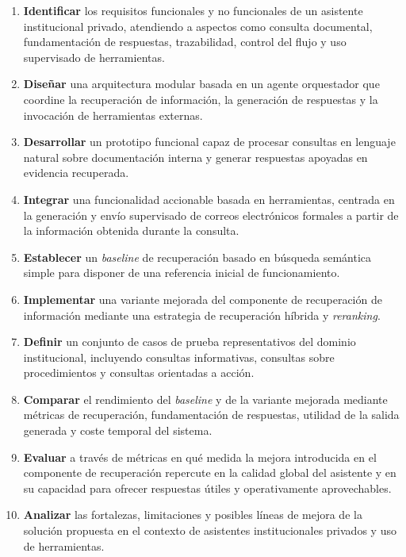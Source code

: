 \begin{enumerate}
    \item \textbf{Identificar} los requisitos funcionales y no funcionales de un asistente institucional privado, atendiendo a aspectos como consulta documental, fundamentación de respuestas, trazabilidad, control del flujo y uso supervisado de herramientas.

    \item \textbf{Diseñar} una arquitectura modular basada en un agente orquestador que coordine la recuperación de información, la generación de respuestas y la invocación de herramientas externas.

    \item \textbf{Desarrollar} un prototipo funcional capaz de procesar consultas en lenguaje natural sobre documentación interna y generar respuestas apoyadas en evidencia recuperada.

    \item \textbf{Integrar} una funcionalidad accionable basada en herramientas, centrada en la generación y envío supervisado de correos electrónicos formales a partir de la información obtenida durante la consulta.

    \item \textbf{Establecer} un \textit{baseline} de recuperación basado en búsqueda semántica simple para disponer de una referencia inicial de funcionamiento.

    \item \textbf{Implementar} una variante mejorada del componente de recuperación de información mediante una estrategia de recuperación híbrida y \textit{reranking}.

    \item \textbf{Definir} un conjunto de casos de prueba representativos del dominio institucional, incluyendo consultas informativas, consultas sobre procedimientos y consultas orientadas a acción.

    \item \textbf{Comparar} el rendimiento del \textit{baseline} y de la variante mejorada mediante métricas de recuperación, fundamentación de respuestas, utilidad de la salida generada y coste temporal del sistema.

    \item \textbf{Evaluar} a través de métricas en qué medida la mejora introducida en el componente de recuperación repercute en la calidad global del asistente y en su capacidad para ofrecer respuestas útiles y operativamente aprovechables.

    \item \textbf{Analizar} las fortalezas, limitaciones y posibles líneas de mejora de la solución propuesta en el contexto de asistentes institucionales privados y uso de herramientas.
\end{enumerate}

